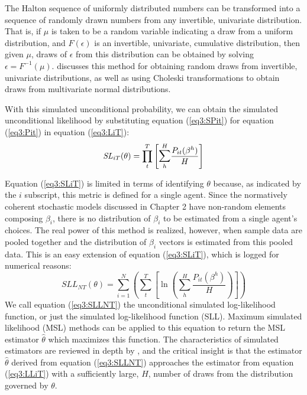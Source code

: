 \documentclass[../main.tex]{subfiles}
\begin{document}
The Halton sequence of uniformly distributed numbers can be transformed into a sequence of randomly drawn numbers from any invertible, univariate distribution.
That is, if $\mu$ is taken to be a random variable indicating a draw from a uniform distribution, and $F(\epsilon)$ is an invertible, univariate, cumulative distribution, then given $\mu$, draws of $\epsilon$ from this distribution can be obtained by solving $\epsilon = F^{-1}(\mu)$.
\textcite[236]{Train2002} discusses this method for obtaining random draws from invertible, univariate distributions, as well as using Choleski transformations to obtain draws from multivariate normal distributions.

With this simulated unconditional probability, we can obtain the simulated unconditional likelihood by substituting equation (\ref{eq3:SPit}) for equation (\ref{eq3:Pit}) in equation (\ref{eq3:LiT}):
\begin{equation}
	\label{eq3:SLiT}
	\mathit{SL}_{iT}(\theta) = \prod_t^T \left[ \mathlarger{\sum}_h^H \frac{ P_{it}(\beta^h) }{H} \right]
\end{equation}

Equation (\ref{eq3:SLiT}) is limited in terms of identifying $\theta$ because, as indicated by the $i$ subscript, this metric is defined for a single agent.
Since the normatively coherent stochastic models discussed in Chapter 2 have non-random elements composing $\beta_i$, there is no distribution of $\beta_i$ to be estimated from a single agent's choices.
The real power of this method is realized, however, when sample data are pooled together and the distribution of $\beta_i$ vectors is estimated from this pooled data.
This is an easy extension of equation (\ref{eq3:SLiT}), which is logged for numerical reasons:
\begin{equation}
	\label{eq3:SLLNT}
	\mathit{SLL}_{NT}(\theta) = \sum_{i=1}^N \left( \sum_t^T \left[ \ln\!\left( \sum_h^H \frac{ P_{it}(\beta^h) }{H} \right) \right] \right)
\end{equation}
\noindent We call equation (\ref{eq3:SLLNT}) the unconditional simulated log-likelihood function, or just the simulated log-likelihood function (SLL).
Maximum simulated likelihood (MSL) methods can be applied to this equation to return the MSL estimator $\hat{\theta}$ which maximizes this function.
The characteristics of simulated estimators are reviewed in depth by \textcite[Chapter~10]{Train2002}, and the critical insight is that the estimator $\hat{\theta}$ derived from equation (\ref{eq3:SLLNT}) approaches the estimator from equation (\ref{eq3:LLiT}) with a sufficiently large, $H$, number of draws from the distribution governed by $\theta$.
\end{document}
